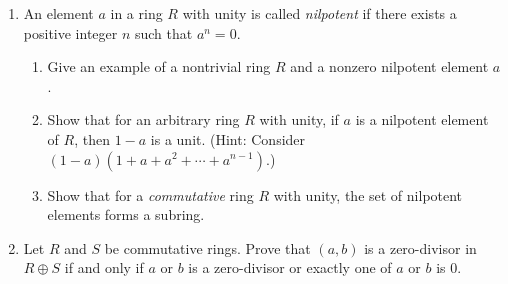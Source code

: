 \documentclass{article}
\begin{document}
\begin{enumerate}
\begin{enumerate}
     \end{enumerate}


    \item An element $a$ in a ring $R$ with unity is called \emph{nilpotent} if there exists a positive integer $n$ such that $a^n=0$. 
    \begin{enumerate}
        \item Give an example of a nontrivial ring $R$ and a nonzero nilpotent element $a$.
        

        \item Show that for an arbitrary ring $R$ with unity, if $a$ is a nilpotent element of $R$, then $1-a$ is a unit. (Hint: Consider $(1-a)(1+a+a^2+\cdots + a^{n-1})$.)
        

        \item Show that for a \emph{commutative} ring $R$ with unity, the set of nilpotent elements forms a subring.
        

        
    \end{enumerate}


    \item Let $R$ and $S$ be commutative rings. Prove that $(a,b)$ is a zero-divisor in $R\oplus S$ if and only if $a$ or $b$ is a zero-divisor or exactly one of $a$ or $b$ is 0. 
    
\end{enumerate}
\end{document}
